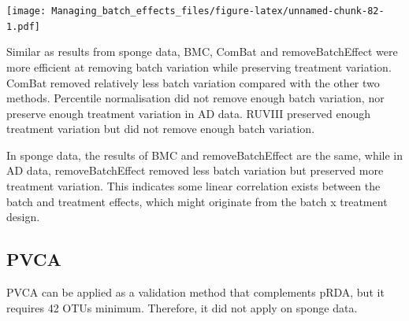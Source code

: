 \documentclass[]{book}
\begin{document}
\texttt{[image: Managing\_batch\_effects\_files/figure-latex/unnamed-chunk-82-1.pdf]}

Similar as results from sponge data, BMC, ComBat and removeBatchEffect
were more efficient at removing batch variation while preserving
treatment variation. ComBat removed relatively less batch variation
compared with the other two methods. Percentile normalisation did not
remove enough batch variation, nor preserve enough treatment variation
in AD data. RUVIII preserved enough treatment variation but did not
remove enough batch variation.

In sponge data, the results of BMC and removeBatchEffect are the same,
while in AD data, removeBatchEffect removed less batch variation but
preserved more treatment variation. This indicates some linear
correlation exists between the batch and treatment effects, which might
originate from the batch x treatment design.

\subsection{PVCA}\label{pvca}

PVCA can be applied as a validation method that complements pRDA, but it
requires 42 OTUs minimum. Therefore, it did not apply on sponge data.
\end{document}
